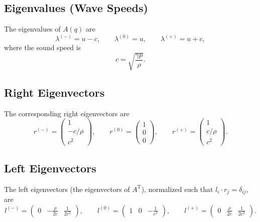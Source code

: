 \documentclass{article}
\begin{document}
\subsection*{Eigenvalues (Wave Speeds)}
The eigenvalues of $A(q)$ are
\begin{equation}
\lambda^{(-)} = u - c, 
\qquad \lambda^{(0)} = u, 
\qquad \lambda^{(+)} = u + c,
\end{equation}
where the sound speed is
\begin{equation}
c = \sqrt{\frac{\gamma p}{\rho}}.
\end{equation}


\subsection*{Right Eigenvectors}

The corresponding right eigenvectors are
\begin{equation}
r^{(-)} =
\begin{pmatrix}
1 \\[4pt] -c/\rho \\[4pt] c^2
\end{pmatrix},
\qquad
r^{(0)} =
\begin{pmatrix}
1 \\[4pt] 0 \\[4pt] 0
\end{pmatrix},
\qquad
r^{(+)} =
\begin{pmatrix}
1 \\[4pt] c/\rho \\[4pt] c^2
\end{pmatrix}.
\end{equation}

\subsection*{Left Eigenvectors}

The left eigenvectors (the eigenvectors of $A^\mathrm{T}$), normalized such that $l_i \cdot r_j = \delta_{ij}$, are
\begin{equation}
l^{(-)} = 
\begin{pmatrix}
0 & -\tfrac{\rho}{2c} & \tfrac{1}{2c^2}
\end{pmatrix},
\qquad
l^{(0)} = 
\begin{pmatrix}
1 & 0 & -\tfrac{1}{c^2}
\end{pmatrix},
\qquad
l^{(+)} = 
\begin{pmatrix}
0 & \tfrac{\rho}{2c} & \tfrac{1}{2c^2}
\end{pmatrix}.
\end{equation}
\end{document}
